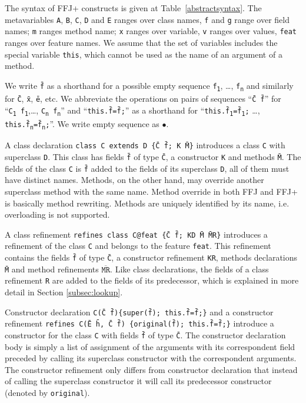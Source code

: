 The syntax of \ac{FFJ+} constructs is given at Table~\ref{abstractsyntax}. The metavariables
\texttt{A}, \texttt{B}, \texttt{C}, \texttt{D} and \texttt{E} ranges over class names, \texttt{f} and \texttt{g} range over
field names; \texttt{m} ranges method name; \texttt{x} ranges over variable, \texttt{v} ranges over
values, \texttt{feat} ranges over feature names. We assume that the set of variables includes the special variable \texttt{this}, which
cannot be used as the name of an argument of a method.

We write \texttt{\=f} as a shorthand for a possible empty sequence \texttt{f\textsubscript1}, \dots, \texttt{f\textsubscript{n}} 
and similarly for \texttt{\=C}, \texttt{\=x}, \texttt{\=e}, etc. We abbreviate the operations on pairs of sequences
``\texttt{\=C~\=f}'' for ``\texttt{C\textsubscript1~f\textsubscript1},\dots, \texttt{C\textsubscript{n}~f\textsubscript{n}}''
and ``\texttt{this.\=f=\=f;}'' as a shorthand for 
``\texttt{this.\=f\textsubscript1=\=f\textsubscript1;} \dots, \texttt{this.\=f\textsubscript{n}=\=f\textsubscript{n};}''.
We write empty sequence as $\bullet$.


A class declaration \texttt{class\ C~extends~D\ \{\={C} \={f}; K \={M}\}} 
introduces a class \texttt{C} with superclass \texttt{D}. This class has fields \texttt{\=f}
of type \texttt{\=C}, a constructor \texttt{K} and methods \texttt{\=M}. The fields of the class \texttt{C}
is \texttt{\=f} added to the fields of its superclass \texttt{D}, all of them must have distinct names.
Methods, on the other hand, may override another superclass method with the same name.
Method override in both \ac{FFJ} and \ac{FFJ+} is basically method rewriting. 
Methods are uniquely identified by its name, i.e. overloading is not supported.

A class refinement \texttt{refines~class~C@feat~\{\={C}~\={f};~KD~\={M}~\={MR}\}}
introduces a refinement of the class \texttt{C} and belongs to the feature \texttt{feat}. 
This refinement contains the fields  \texttt{\=f} of type \texttt{\=C}, 
a constructor refinement \texttt{KR}, methods declarations \texttt{\=M} and method refinements $\overline{\texttt{MR}}$.
Like class declarations, the fields of a class refinement \texttt{R} are added to the fields of its predecessor, which
is explained in more detail in Section \ref{subsec:lookup}.

Constructor declaration \texttt{C(\={C}~\={f})\{super(\={f}); this.\={f}=\={f};\}} and a constructor refinement 
\texttt{refines~C(\={E}~\={h}, \={C}~\={f}) \{original(\={f}); this.\={f}=\={f};\}} introduce a constructor 
for the class \texttt{C} with fields \texttt{\=f} of type \texttt{\=C}. The constructor declaration body is simply 
a list of assignment of the arguments with its correspondent field preceded by calling its superclass constructor with the correspondent arguments.
The constructor refinement only differs from constructor declaration that instead of calling the superclass constructor
it will call its predecessor constructor (denoted by \texttt{original}).

